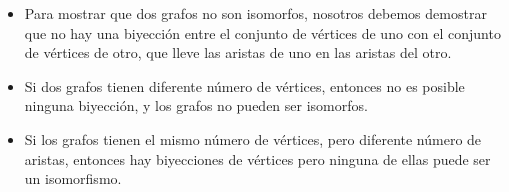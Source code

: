 \documentclass[handout]{beamer} %
\begin{document}
	\begin{frame}
		\begin{itemize}
			\item Para mostrar que dos grafos no son isomorfos, nosotros debemos
			demostrar que no hay una biyección entre el conjunto de vértices
			de uno con el conjunto de vértices de otro, que lleve las aristas
			de uno en las aristas del otro.\pause
			\item 	Si dos grafos tienen diferente número de vértices, entonces no es
			posible ninguna biyección, y los grafos no pueden ser isomorfos.\pause
			\item Si los grafos tienen el mismo número de vértices, pero di\-fe\-ren\-te
			número de aristas, entonces hay biyecciones de vértices  pero ninguna de ellas
			puede ser un isomorfismo. 
		\end{itemize}
		
		
		
		
		
	\end{frame}
	
\end{document}
